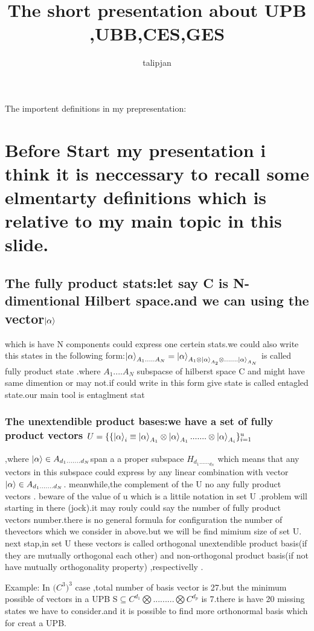 \documentclass[a4paper,12pt]{article}
\title{The short presentation about UPB ,UBB,CES,GES}
\author{talipjan}
\begin{document}
 \maketitle
 The importent  definitions in my prepresentation:
 
 \section{Before Start my presentation i think it is neccessary to  recall some elmentarty definitions which is relative to my main topic in this slide. }
 \subsection{The fully product stats:let say C is N-dimentional Hilbert space.and we can using the 
 	vector$ \ket{\alpha} $} which is have N components could express one certein stats.we could also write this states in the following form:$\ket{\alpha}_{A_{1}.....A_{N}}=\ket{\alpha}_{A_{1}\otimes\ket{\alpha}_{A_{2}}\otimes.......\ket{\alpha}_{A_{N}}}$
 is called fully product state .where $A_{1}....A_{N}$ subspacse  of hilberst space C and might have same dimention or may not.if could write in this form give state is called entagled state.our main tool is entaglment stat
 \subsubsection{The unextendible product bases:we have a set of fully product vectors $U=\{\{\ket{\alpha}_{i}\equiv\ket{\alpha}_{A_{1}}\otimes\ket{\alpha}_{A_{1}}.......\otimes\ket{\alpha}_{A_{i}}\}_{i=1}^{u}$} ,where $\ket{\alpha}\in A_{d_{1}.......d_{N}}$span  a a proper subspace $H_{d_{1}......_{d_{N}}}$ which means that any vectors in this subspace could express by any linear combination with vector $\ket{\alpha}\in A_{d_{1}.......d_{N}}$.
 meanwhile,the complement of the U no any fully product vectors .
 beware of the value of u which is a littile notation in set U .problem will starting in there (jock).it may rouly could say the number of fully product vectors number.there is no general formula for configuration the number  of  thevectors which we consider in above.but we will be find mimium size of set U.
 next stap,in set  U these vectors is called orthogonal unextendible product basis(if they are mutually orthogonal each other) and non-orthogonal product basis(if not have mutually orthogonality property) ,respectivelly .
 
 {\scriptsize {\Huge }}Example: In ${(C^{3}})^{3}$ case ,total number of basis vector is 27.but the minimum possible of vectors in a UPB S$\subseteq C^{d_{1}}\bigotimes.........\bigotimes C^{d_{p}}$ is 7.there is have 20 missing states we have to consider.and it is possible to find more orthonormal basis which for creat a UPB.
 
\end{document}
